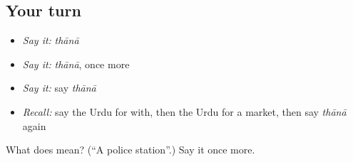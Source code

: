 \subsection*{Your turn}
\begin{itemize}
\raggedright
  \item \emph{Say it:} \emph{thānā}
  \item \emph{Say it:} \emph{thānā}, once more
  \item \emph{Say it:} say \emph{thānā}
  \item \emph{Recall:} say the Urdu for with, then the Urdu for a market, then say \emph{thānā} again
\end{itemize}

\begin{tcolorbox}[breakable,colback=teal!4,colframe=teal!35!black,title={Before you move on}]
What does  mean? (\textquotedblleft{}A police station\textquotedblright{}.) Say it once more.
\end{tcolorbox}
